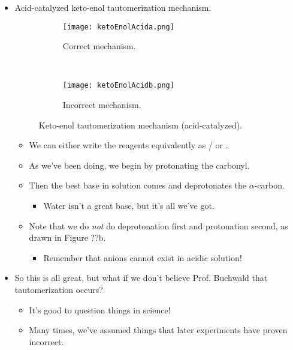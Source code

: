 \documentclass[../notes.tex]{subfiles}
\begin{document}
\begin{itemize}
    \item Acid-catalyzed keto-enol tautomerization mechanism.
    \begin{figure}[h!]
        \centering
        \begin{subfigure}[b]{\linewidth}
            \centering
            \texttt{[image: ketoEnolAcida.png]}
            \caption{Correct mechanism.}
            \label{fig:ketoEnolAcida}
        \end{subfigure}\\[2em]
        \begin{subfigure}[b]{\linewidth}
            \centering
            \texttt{[image: ketoEnolAcidb.png]}
            \caption{Incorrect mechanism.}
            \label{fig:ketoEnolAcidb}
        \end{subfigure}
        \caption{Keto-enol tautomerization mechanism (acid-catalyzed).}
        \label{fig:ketoEnolAcid}
    \end{figure}
    \begin{itemize}
        \item We can either write the reagents equivalently as / or .
        \item As we've been doing, we begin by protonating the carbonyl.
        \item Then the best base in solution comes and deprotonates the $\alpha$-carbon.
        \begin{itemize}
            \item Water isn't a great base, but it's all we've got.
        \end{itemize}
        \item Note that we do \emph{not} do deprotonation first and protonation second, as drawn in Figure ??b.
        \begin{itemize}
            \item Remember that anions cannot exist in acidic solution!
        \end{itemize}
    \end{itemize}
    \item So this is all great, but what if we don't believe Prof. Buchwald that tautomerization occurs?
    \begin{itemize}
        \item It's good to question things in science!
        \item Many times, we've assumed things that later experiments have proven incorrect.
    \end{itemize}

\end{itemize}
\end{document}
